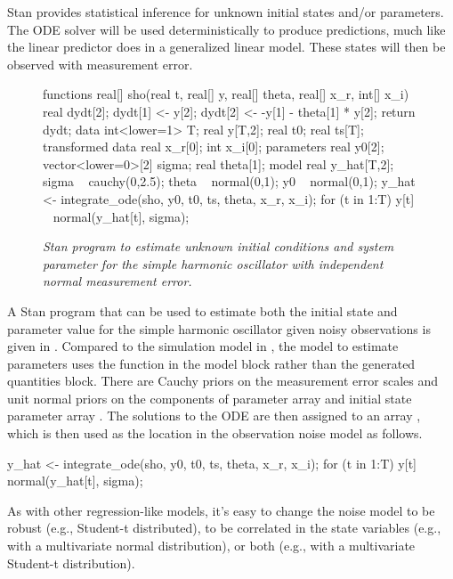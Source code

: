 Stan provides statistical inference for unknown initial states and/or
parameters.  The ODE solver will be used deterministically to produce
predictions, much like the linear predictor does in a generalized
linear model.  These states will then be observed with measurement error.

%
\begin{figure}
\begin{stancode}
functions {
  real[] sho(real t,
             real[] y, 
             real[] theta,
             real[] x_r,
             int[] x_i) {
    real dydt[2];
    dydt[1] <- y[2];
    dydt[2] <- -y[1] - theta[1] * y[2];
    return dydt;
  }
}
data {
  int<lower=1> T;
  real y[T,2];
  real t0;
  real ts[T];
}
transformed data {
  real x_r[0];
  int x_i[0];
}
parameters {
  real y0[2];
  vector<lower=0>[2] sigma;
  real theta[1];
}
model {
  real y_hat[T,2];
  sigma ~ cauchy(0,2.5);
  theta ~ normal(0,1);
  y0 ~ normal(0,1);
  y_hat <- integrate_ode(sho, y0, t0, ts, theta, x_r, x_i);
  for (t in 1:T)
    y[t] ~ normal(y_hat[t], sigma);
}
\end{stancode}
\vspace*{-0.2in}
\caption{\small\it Stan program to estimate unknown initial conditions
   and system parameter  for the simple harmonic
  oscillator with independent normal measurement
  error.}\label{sho-both.figure}
\end{figure}
%
A Stan program that can be used to estimate both the initial state and
parameter value for the simple harmonic oscillator given noisy
observations is given in .  Compared to the
simulation model in , the model to estimate
parameters uses the  function in the model block
rather than the generated quantities block.  There are Cauchy priors on the
measurement error scales  and unit normal priors on the
components of parameter array  and initial state parameter
array .  The solutions to the ODE are then assigned to an
array , which is then used as the location in the
observation noise model as follows.
%
\begin{stancode}
y_hat <- integrate_ode(sho, y0, t0, ts, theta, x_r, x_i);
for (t in 1:T)
  y[t] ~ normal(y_hat[t], sigma);
\end{stancode}
%
As with other regression-like models, it's easy to change the noise
model to be robust (e.g., Student-t distributed), to be correlated in
the state variables (e.g., with a multivariate normal distribution),
or both (e.g., with a multivariate Student-t distribution).

